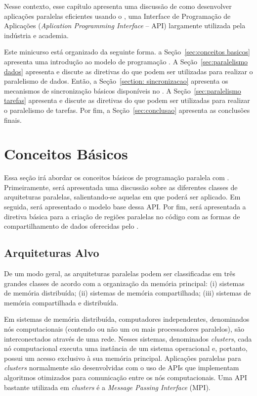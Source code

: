 \documentclass{SBCbookchapter}
\begin{document}
	Nesse contexto, esse capítulo apresenta uma discussão de como
	desenvolver aplicações paralelas eficientes usando o \openmp, uma
	Interface de Programação de Aplicações (\textit{Aplication
	Programming Interface} -- API) largamente utilizada pela indústria e
	academia. 
	
	Este minicurso está organizado da seguinte forma. a Seção~\ref{sec:conceitos
	basicos} apresenta uma introdução ao modelo de programação \openmp.
	A Seção~\ref{sec:paralelismo dados} apresenta e discute as diretivas do
	\openmp que podem ser utilizadas para realizar o paralelismo de dados.
	Então, a Seção~\ref{section: sincronizacao} apresenta os mecanismos de
	sincronização básicos disponíveis no \openmp. A Seção~\ref{sec:paralelismo
	tarefas} apresenta e discute as diretivas do \openmp que podem ser utilizadas para 
	realizar o paralelismo de tarefas. Por fim, a Seção~\ref{sec:conclusao} apresenta
	as conclusões finais.

\section{Conceitos Básicos}
\label{sec:conceitos basicos}

	Essa seção irá abordar os conceitos básicos de programação paralela com
	\openmp. Primeiramente, será apresentada uma discussão sobre as diferentes
	classes de arquiteturas paralelas, salientando-se aquelas em que \openmp
	poderá ser aplicado.	Em seguida, será apresentado o modelo base dessa API.
	Por fim, será apresentada a diretiva básica para a criação de regiões paralelas
	no código com as formas de compartilhamento de dados oferecidas pelo \openmp.

	\subsection{Arquiteturas Alvo}

		De um modo geral, as arquiteturas paralelas podem ser classificadas em três
		grandes classes de acordo com a organização da memória principal: (i) sistemas de memória
		distribuída; (ii) sistemas de memória compartilhada; (iii) sistemas de memória compartilhada
		e distribuída.
		
		Em sistemas de memória distribuída, computadores independentes, denominados nós
		computacionais (contendo ou não um ou mais processadores paralelos), são interconectados
		através de uma rede. Nesses sistemas, denominados \textit{clusters}, cada nó computacional
		executa uma instância de um sistema operacional e, portanto, possui um acesso exclusivo à sua
		memória principal. Aplicações paralelas para \textit{clusters} normalmente são desenvolvidas
		com o uso de APIs que implementam algoritmos otimizados para comunicação entre os nós
		computacionais. Uma API bastante utilizada em \textit{clusters} é a \textit{Message Passing
		Interface} (MPI).
		
\end{document}
